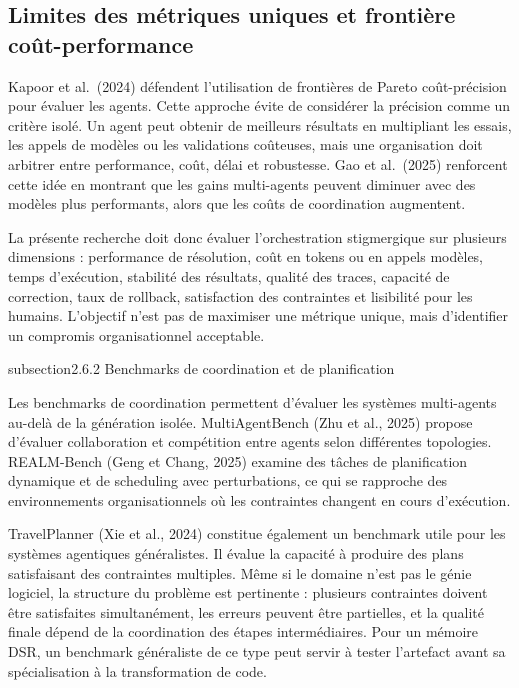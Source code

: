 \subsection{Limites des métriques uniques et frontière coût-performance}\label{limites-des-muxe9triques-uniques-et-frontiuxe8re-couxfbt-performance}

Kapoor et al.~(2024) défendent l'utilisation de frontières de Pareto coût-précision pour évaluer les agents. Cette approche évite de considérer la précision comme un critère isolé. Un agent peut obtenir de meilleurs résultats en multipliant les essais, les appels de modèles ou les validations coûteuses, mais une organisation doit arbitrer entre performance, coût, délai et robustesse. Gao et al.~(2025) renforcent cette idée en montrant que les gains multi-agents peuvent diminuer avec des modèles plus performants, alors que les coûts de coordination augmentent.

La présente recherche doit donc évaluer l'orchestration stigmergique sur plusieurs dimensions : performance de résolution, coût en tokens ou en appels modèles, temps d'exécution, stabilité des résultats, qualité des traces, capacité de correction, taux de rollback, satisfaction des contraintes et lisibilité pour les humains. L'objectif n'est pas de maximiser une métrique unique, mais d'identifier un compromis organisationnel acceptable.

subsection{2.6.2 Benchmarks de coordination et de planification}\label{benchmarks-de-coordination-et-de-planification}

Les benchmarks de coordination permettent d'évaluer les systèmes multi-agents au-delà de la génération isolée. MultiAgentBench (Zhu et al., 2025) propose d'évaluer collaboration et compétition entre agents selon différentes topologies. REALM-Bench (Geng et Chang, 2025) examine des tâches de planification dynamique et de scheduling avec perturbations, ce qui se rapproche des environnements organisationnels où les contraintes changent en cours d'exécution.

TravelPlanner (Xie et al., 2024) constitue également un benchmark utile pour les systèmes agentiques généralistes. Il évalue la capacité à produire des plans satisfaisant des contraintes multiples. Même si le domaine n'est pas le génie logiciel, la structure du problème est pertinente : plusieurs contraintes doivent être satisfaites simultanément, les erreurs peuvent être partielles, et la qualité finale dépend de la coordination des étapes intermédiaires. Pour un mémoire DSR, un benchmark généraliste de ce type peut servir à tester l'artefact avant sa spécialisation à la transformation de code.

